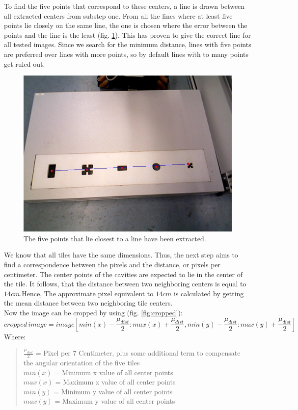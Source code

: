 \documentclass{article}
\begin{document}
To find the five points that correspond to these centers, a line is drawn between all extracted centers from substep one. From all the lines where at least five points lie closely on the same line, the one is chosen where the error between the points and the line is the least (fig. \ref{fig:line}). This has proven to give the correct line for all tested images. Since we search for the minimum distance, lines with five points are preferred over lines with more points, so by default lines with to many points get ruled out.\\
\begin{figure}[h!]
\centering
\includegraphics[scale=0.3]{images/line.jpg}
\caption{The five points that lie closest to a line have been extracted.}
\label{fig:line}
\end{figure}
We know that all tiles have the same dimensions. Thus, the next step aims to find a correspondence between the pixels and the distance, or pixels per centimeter. The center points of the cavities are expected to lie in the center of the tile. It follows, that the distance between two neighboring centers is equal to $14cm$.Hence, The approximate pixel equivalent to $14cm$ is calculated by getting the mean distance between two neighboring tile centers.\\
Now the image can be cropped by using (fig. \ref{fig:cropped}):
\begin{equation}
cropped \, image = image[min(x)-\frac{\mu_{dist}}{2}:max(x)+\frac{\mu_{dist}}{2},min(y)-\frac{\mu_{dist}}{2}:max(y)+\frac{\mu_{dist}}{2}]
\end{equation}
Where:
\begin{quote}
$\frac{\mu_{dist}}{2}$ = Pixel per 7 Centimeter, plus some additional term to compensate the angular orientation of the five tiles\\
$min(x)$ = Minimum x value of all center points\\
$max(x)$ = Maximum x value of all center points\\
$min(y)$ = Minimum y value of all center points\\
$max(y)$ = Maximum y value of all center points\\
\end{quote}
\end{document}
